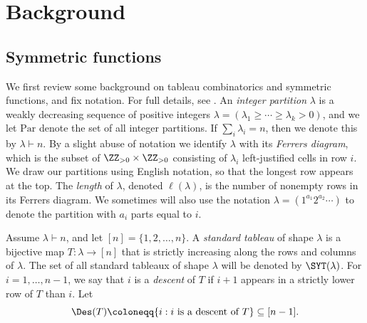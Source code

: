 \section{Background}\label{sec:background}
\subsection{Symmetric functions}\label{sec:symf}
We first review some background on tableau combinatorics and symmetric functions, and fix notation. For full details, see \cite[Chapter~7]{Stan}. An \emph{integer partition} $\lambda$ is a weakly decreasing sequence of positive integers $\lambda = (\lambda_1 \ge \cdots \ge \lambda_k > 0)$, and we let $\mathrm{Par}$ denote the set of all integer partitions. If $\sum_i \lambda_i = n$, then we denote this by $\lambda \vdash n$. By a slight abuse of notation we identify $\lambda$ with its \emph{Ferrers diagram}, which is the subset of $\ZZ_{>0} \times \ZZ_{>0}$ consisting of $\lambda_i$ left-justified cells in row $i$. We draw our partitions using English notation, so that the longest row appears at the top. The \emph{length} of $\lambda$, denoted $\ell(\lambda)$, is the number of nonempty rows in its Ferrers diagram. We sometimes will also use the notation $\lambda = (1^{a_1}2^{a_2} \cdots)$ to denote the partition with $a_i$ parts equal to $i$. 

Assume $\lambda \vdash n$, and let $[n] = \{ 1, 2, \ldots, n \}$. A \emph{standard tableau} of shape $\lambda$ is a bijective map $T : \lambda \to [n]$ that is strictly increasing along the rows and columns of $\lambda$. The set of all standard tableaux of shape $\lambda$ will be denoted by $\SYT(\lambda)$. For $i = 1, \ldots, n-1$, we say that $i$ is a \emph{descent} of $T$ if $i+1$ appears in a strictly lower row of $T$ than $i$. Let
\[
\Des(T) \coloneqq \{ i : i \text{ is a descent of } T \} \subseteq [n-1].
\]
